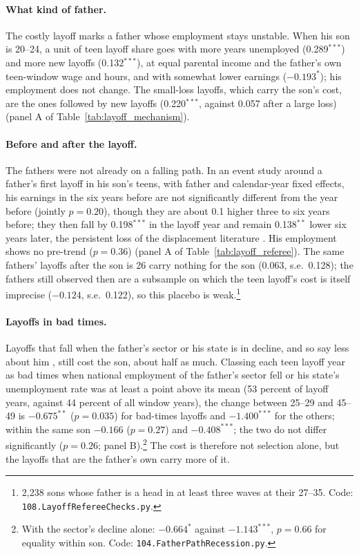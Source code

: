 

\paragraph{What kind of father.} The costly layoff marks a father whose employment stays unstable. When his son is
20--24, a unit of teen layoff share goes with more years unemployed (0.289$^{***}$) and more new layoffs (0.132$^{***}$),
at equal parental income and the father's own teen-window wage and hours, and with somewhat lower earnings
($-0.193^{*}$); his employment does not change. The small-loss layoffs, which carry the son's cost, are the ones
followed by new layoffs (0.220$^{***}$, against 0.057 after a large loss) (panel A of Table~\ref{tab:layoff_mechanism}).

\paragraph{Before and after the layoff.} The fathers were not already on a falling path. In an event study around a
father's first layoff in his son's teens, with father and calendar-year fixed effects, his earnings in the six years
before are not significantly different from the year before (jointly $p = 0.20$), though they are about 0.1 higher three
to six years before; they then fall by 0.198$^{***}$ in the layoff year and remain 0.138$^{**}$ lower six years later, the
persistent loss of the displacement literature \citep{stevens1997persistent}. His employment shows no pre-trend ($p =
0.36$) (panel A of Table~\ref{tab:layoff_referee}). The same fathers' layoffs after the son is 26 carry nothing for the
son (0.063, s.e.\ 0.128); the fathers still observed then are a subsample on which the teen layoff's cost is itself
imprecise ($-0.124$, s.e.\ 0.122), so this placebo is weak.\footnote{2,238 sons whose father is a head in at least three
waves at their 27--35. Code: \texttt{108.LayoffRefereeChecks.py}.}

\paragraph{Layoffs in bad times.} Layoffs that fall when the father's sector or his state is in decline, and so say
less about him \citep{gibbons1991layoffs}, still cost the son, about half as much. Classing each teen layoff year as bad
times when national employment of the father's sector fell or his state's unemployment rate was at least a point above
its mean (53 percent of layoff years, against 44 percent of all window years), the change between 25--29 and 45--49 is
$-0.675^{**}$ ($p = 0.035$) for bad-times layoffs and $-1.400^{***}$ for the others; within the same son $-0.166$ ($p =
0.27$) and $-0.408^{***}$; the two do not differ significantly ($p = 0.26$; panel B).\footnote{With the sector's decline
alone: $-0.664^{*}$ against $-1.143^{***}$, $p = 0.66$ for equality within son. Code: \texttt{104.FatherPathRecession.py}.}
The cost is therefore not selection alone, but the layoffs that are the father's own carry more of it.

